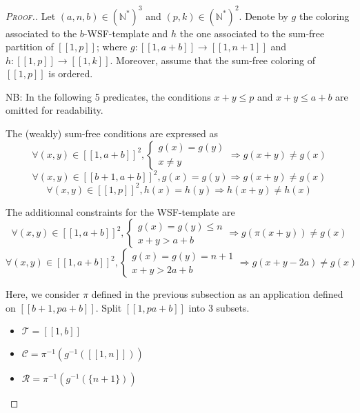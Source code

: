\begin{proof}[\textsc{Proof.}]
\begin{sloppypar}
Let \((a,n,b) \in (\mathbb{N}^*)^3\) and \((p,k) \in (\mathbb{N}^*)^2\). Denote by \(g\) the coloring 
associated to the \(b\)-WSF-template  and \(h\) the one associated to the sum-free partition of \([\![1,p]\!]\); where 
\({g : [\![1, a + b]\!] \longrightarrow [\![1,n+1]\!]}\) and \({h : [\![1, p]\!]  \longrightarrow [\![1, k]\!]}\). Moreover, assume 
that the sum-free coloring of \([\![1, p]\!]\) is ordered.
\end{sloppypar}

\par
NB: In the following 5 predicates, the conditions \(x + y \leqslant p\)  and \(x + y \leqslant a + b\) are omitted for readability.
\par
The (weakly) sum-free conditions are expressed as 
\[
\forall (x,y) \in [\![1,a + b]\!]^2, \left\{
\begin{array}{l}
	g(x) = g(y) \\
	x \neq y
\end{array}
\right. \Longrightarrow g(x+y) \neq g(x)
\]
\[
\forall (x,y) \in [\![b+1,a + b]\!]^2, g(x) = g(y) \Longrightarrow g(x+y) \neq g(x)
\]
\[
\forall (x,y) \in [\![1,p]\!]^2, h(x) = h(y) \Longrightarrow h(x+y) \neq h(x)
\]

The additionnal constraints for the WSF-template are
\[
\forall (x,y) \in [\![1,a + b]\!]^2, \left\{
\begin{array}{l}
	g(x) = g(y) \leqslant n \\
	x + y > a + b
\end{array}
\right. \Longrightarrow g(\pi(x+y)) \neq g(x)
\]
\[
\forall (x,y) \in [\![1,a + b]\!]^2, \left\{
\begin{array}{l}
	g(x) = g(y) = n + 1 \\
	x + y > 2 a + b
\end{array}
\right. \Longrightarrow g(x+y - 2 a) \neq g(x)
\]

Here, we consider \(\pi\) defined in the previous subsection as an application defined on \([\![b + 1, p a + b]\!]\). 
Split \([\![1, p a + b]\!]\) into 3 subsets.

\begin{itemize}
	\item \(\mathcal{T} = [\![1, b]\!]\)
	\item \(\mathcal{C} = \pi^{-1}(g^{-1}([\![1, n]\!]))\)
	\item \(\mathcal{R} = \pi^{-1}(g^{-1}(\{n + 1\}))\)
\end{itemize}


\end{proof}
